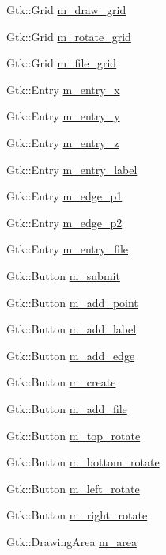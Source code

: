 \begin{DoxyCompactItemize}
\item 
Gtk\+::\+Grid \hyperlink{class_construct_window_a1bcef215bf6404b2c5222909952500e0}{m\+\_\+draw\+\_\+grid}
\item 
Gtk\+::\+Grid \hyperlink{class_construct_window_ab96011e590f3138153ef221be1608865}{m\+\_\+rotate\+\_\+grid}
\item 
Gtk\+::\+Grid \hyperlink{class_construct_window_a5d9e8a08026b6381853aa5d7ddf8d062}{m\+\_\+file\+\_\+grid}
\item 
Gtk\+::\+Entry \hyperlink{class_construct_window_a11982439b17251d83fc2d2eadd5b4c0a}{m\+\_\+entry\+\_\+x}
\item 
Gtk\+::\+Entry \hyperlink{class_construct_window_ad05c6e1379b84f795ae4b495d3621a1d}{m\+\_\+entry\+\_\+y}
\item 
Gtk\+::\+Entry \hyperlink{class_construct_window_a21e505c7b74d70e3f37ca94c6dc79bbc}{m\+\_\+entry\+\_\+z}
\item 
Gtk\+::\+Entry \hyperlink{class_construct_window_a031a78a66f7c69da3395c25c8d84c699}{m\+\_\+entry\+\_\+label}
\item 
Gtk\+::\+Entry \hyperlink{class_construct_window_a49425c4f8cc175011f608ef26598ecc0}{m\+\_\+edge\+\_\+p1}
\item 
Gtk\+::\+Entry \hyperlink{class_construct_window_a2cd8576e8bcd49dfedaa82c65766028e}{m\+\_\+edge\+\_\+p2}
\item 
Gtk\+::\+Entry \hyperlink{class_construct_window_a18364de5c0d738051d7eeb478bf4086b}{m\+\_\+entry\+\_\+file}
\item 
Gtk\+::\+Button \hyperlink{class_construct_window_a855cdd124dc2fb10b911e88b5d020a59}{m\+\_\+submit}
\item 
Gtk\+::\+Button \hyperlink{class_construct_window_a18879d0b8580c30589fd3dcd2a3de7d6}{m\+\_\+add\+\_\+point}
\item 
Gtk\+::\+Button \hyperlink{class_construct_window_a1dd9adca873008e41db7a7610e9cd1fb}{m\+\_\+add\+\_\+label}
\item 
Gtk\+::\+Button \hyperlink{class_construct_window_a8eb470f90db79f60612a0389d3d9a93f}{m\+\_\+add\+\_\+edge}
\item 
Gtk\+::\+Button \hyperlink{class_construct_window_acaf528e94f75726e4168b6b21e57a4c1}{m\+\_\+create}
\item 
Gtk\+::\+Button \hyperlink{class_construct_window_a62de6f36977a3b994c45a8792aeb39e2}{m\+\_\+add\+\_\+file}
\item 
Gtk\+::\+Button \hyperlink{class_construct_window_a2092e74c068ec46139a1883b1cb4b79e}{m\+\_\+top\+\_\+rotate}
\item 
Gtk\+::\+Button \hyperlink{class_construct_window_ad05f416b88027120b3b5091c7f56994d}{m\+\_\+bottom\+\_\+rotate}
\item 
Gtk\+::\+Button \hyperlink{class_construct_window_a4a4ded63890f51ad62cebe7599294fed}{m\+\_\+left\+\_\+rotate}
\item 
Gtk\+::\+Button \hyperlink{class_construct_window_a6992f35a1c502bfb48743730d4c59273}{m\+\_\+right\+\_\+rotate}
\item 
Gtk\+::\+Drawing\+Area \hyperlink{class_construct_window_a7cfd32007cdcb14ec957c90f7293004f}{m\+\_\+area}
\end{DoxyCompactItemize}


